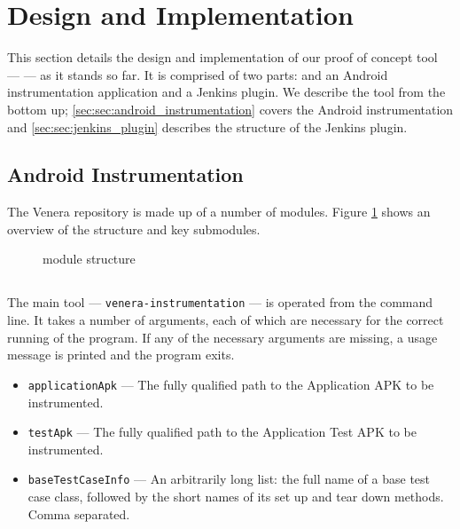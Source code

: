 \section{Design and Implementation}
\label{sec:imp}

This section details the design and implementation of our proof of concept tool
--- \venera --- as it stands so far. It is comprised of two parts: and an
Android instrumentation application and a Jenkins plugin.
We describe the tool from the bottom up;
\autoref{sec:sec:android_instrumentation} covers the Android instrumentation and
\autoref{sec:sec:jenkins_plugin} describes the structure of the Jenkins plugin.

\subsection{Android Instrumentation}
\label{sec:sec:android_instrumentation}

The Venera repository\cite{heisentestInstrumentation} is made up of a number of
modules. Figure \ref{fig:repo_structure} shows an overview of the structure and
key submodules.

\begin{figure}[h]
\caption{\heisentest module structure}
\label{fig:repo_structure}
\end{figure}


\subsection{\venerainst{}}

The main tool --- {\tt venera-instrumentation} --- is operated from the
command line. It takes a number of arguments, each of which are necessary for
the correct running of the program. If any of the necessary arguments are
missing, a usage message is printed and the program exits.

\begin{itemize}
    \item {\tt applicationApk} --- The fully qualified path to the Application
    APK to be instrumented.
    \item {\tt testApk} --- The fully qualified path to the Application Test APK
    to be instrumented.
    \item {\tt baseTestCaseInfo} --- An arbitrarily long list: the full name of
    a base test case class, followed by the short names of its set up and tear
    down methods. Comma separated.
\end{itemize}

